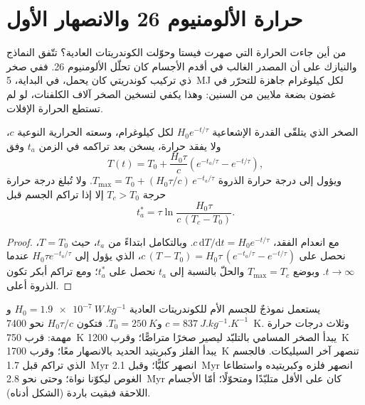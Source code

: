 \section{حرارة الألومنيوم 26 والانصهار الأول}

من أين جاءت الحرارة التي صهرت فيستا وحوّلت الكوندريتات
العادية؟ تتّفق النماذج والنيازك على أن المصدر الغالب في أقدم الأجسام
كان تحلّل الألومنيوم 26. ففي صخر ذي تركيب كوندريتي كان يحمل، في البداية،
\qty{5}{MJ} لكل كيلوغرام جاهزة للتحرّر في غضون بضعة ملايين من السنين:
وهذا يكفي لتسخين الصخر آلاف الكلفنات، لو لم تستطع الحرارة الإفلات.

\begin{proposition}
\label{prop:b2:planet-formation-meteorites:heating}
الصخر الذي يتلقّى القدرة الإشعاعية $H_0 e^{-t/\tau}$ لكل كيلوغرام، وسعته
الحرارية النوعية $c$، ولا يفقد حرارة، يسخن بعد تراكمه في
الزمن $t_a$ وفق
\[
  T(t) = T_0 + \frac{H_0\tau}{c}\left(e^{-t_a/\tau} - e^{-t/\tau}\right),
\]
ويؤول إلى درجة حرارة الذروة
$T_{\max} = T_0 + (H_0\tau/c)\,e^{-t_a/\tau}$. ولا تُبلغ درجة حرارة حرجة
$T_c > T_0$ إلا إذا تراكم الجسم قبل
\[
  t_a^* = \tau\ln\frac{H_0\tau}{c\,(T_c - T_0)}.
\]
\end{proposition}

\begin{proof}
مع انعدام الفقد، $c\,\mathrm dT/\mathrm dt = H_0 e^{-t/\tau}$. وبالتكامل ابتداءً من
$t_a$، حيث $T = T_0$، نحصل على
$c\,(T - T_0) = H_0\tau\,(e^{-t_a/\tau} - e^{-t/\tau})$، الذي يؤول إلى
$H_0\tau e^{-t_a/\tau}$ عندما $t \to \infty$. وبوضع $T_{\max} = T_c$ والحلّ
بالنسبة إلى $t_a$ نحصل على $t_a^*$؛ ومع تراكم أبكر تكون الذروة أعلى.
\end{proof}

يستعمل نموذجٌ للجسم الأم للكوندريتات العادية
$H_0 = \qty{1.9e-7}{W.kg^{-1}}$ و$c = \qty{837}{J.kg^{-1}.K^{-1}}$
و$T_0 = \qty{250}{K}$. فتكون $H_0\tau/c$ نحو \qty{7400}{K}. وثلاث
درجات حرارة مهمة: قرب \qty{750}{K} يبدأ الصخر المسامي بالتلبّد ليصير
صخرًا متراصًّا؛ وقرب \qty{1200}{K} يبدأ الفلز وكبريتيد الحديد بالانصهار
معًا؛ وقرب \qty{1700}{K} تنصهر آخر السيليكات. فالجسم الذي تراكم
قبل \qty{1.7}{Myr} انصهر كليًّا؛ وقبل \qty{2.1}{Myr} انصهر فلزه وكبريتيده
واستطاعا الغوص ليكوّنا نواة؛ وحتى نحو \qty{2.8}{Myr} كان على الأقل
متلبّدًا ومتحوّلًا؛ أمّا الأجسام اللاحقة فبقيت باردة (الشكل أدناه).

